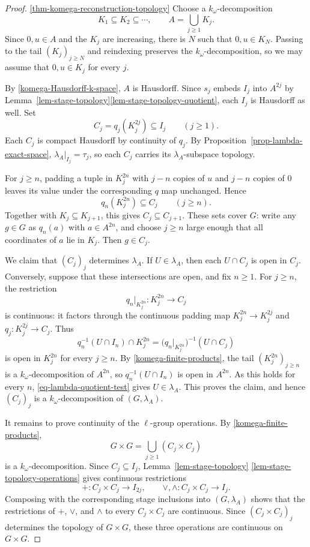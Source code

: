 \documentclass[preprint,3p]{elsarticle}
\theoremstyle{plain}
\theoremstyle{definition}
\numberwithin{equation}{section}
\begin{document}
\begin{proof}
\ref{thm-komega-reconstruction-topology}
Choose a $k_\omega$-decomposition
\[
 K_1\subseteq K_2\subseteq\cdots,\qquad
 A=\bigcup_{j\geq1}K_j.
\]
Since $0,u\in A$ and the $K_j$ are increasing, there is $N$ such that
$0,u\in K_N$.  Passing to the tail $(K_j)_{j\geq N}$ and reindexing
preserves the $k_\omega$-decomposition, so we may assume that
$0,u\in K_j$ for every $j$.

By \ref{komega-Hausdorff-k-space}, $A$ is Hausdorff.
Since $s_j$ embeds $I_j$ into $A^{2j}$ by
Lemma~\ref{lem-stage-topology}\ref{lem-stage-topology-quotient},
each $I_j$ is Hausdorff as well.
Set
\[
 C_j=q_j(K_j^{2j})\subseteq I_j\qquad(j\geq1).
\]
Each $C_j$ is compact Hausdorff by continuity of $q_j$.
By Proposition~\ref{prop-lambda-exact-space}, $\lambda_A|_{I_j}=\tau_j$,
so each $C_j$ carries its $\lambda_A$-subspace topology.

For $j\geq n$, padding a tuple in $K_j^{2n}$ with $j-n$ copies
of $u$ and $j-n$ copies of $0$ leaves its value under the
corresponding $q$ map unchanged.  Hence
\[
 q_n(K_j^{2n})\subseteq C_j\qquad(j\geq n).
\]
Together with $K_j\subseteq K_{j+1}$, this gives
$C_j\subseteq C_{j+1}$.  These sets cover $G$: write any $g\in G$
as $q_n(a)$ with $a\in A^{2n}$, and choose $j\geq n$ large enough
that all coordinates of $a$ lie in $K_j$.  Then $g\in C_j$.

We claim that $(C_j)_j$ determines $\lambda_A$.
If $U\in\lambda_A$, then each $U\cap C_j$ is open in $C_j$.
Conversely, suppose that these intersections are open, and fix $n\geq1$.
For $j\geq n$, the restriction
\[
 q_n|_{K_j^{2n}}\colon K_j^{2n}\longrightarrow C_j
\]
is continuous: it factors through the continuous padding map
$K_j^{2n}\longrightarrow K_j^{2j}$ and
$q_j\colon K_j^{2j}\longrightarrow C_j$.  Thus
\[
 q_n^{-1}(U\cap I_n)\cap K_j^{2n}
 =\bigl(q_n|_{K_j^{2n}}\bigr)^{-1}(U\cap C_j)
\]
is open in $K_j^{2n}$ for every $j\geq n$.
By \ref{komega-finite-products}, the tail $(K_j^{2n})_{j\geq n}$
is a $k_\omega$-decomposition of $A^{2n}$, so
$q_n^{-1}(U\cap I_n)$ is open in $A^{2n}$.
As this holds for every $n$, \eqref{eq-lambda-quotient-test}
gives $U\in\lambda_A$.  This proves the claim, and hence
$(C_j)_j$ is a $k_\omega$-decomposition of $(G,\lambda_A)$.

It remains to prove continuity of the $\ell$-group operations.
By \ref{komega-finite-products},
\[
 G\times G=\bigcup_{j\geq1}(C_j\times C_j)
\]
is a $k_\omega$-decomposition.  Since $C_j\subseteq I_j$,
Lemma~\ref{lem-stage-topology}%
\ref{lem-stage-topology-operations} gives continuous restrictions
\[
 +\colon C_j\times C_j\longrightarrow I_{2j},
 \qquad
 \vee,\wedge\colon C_j\times C_j\longrightarrow I_j.
\]
Composing with the corresponding stage inclusions into
$(G,\lambda_A)$ shows that the restrictions of $+$, $\vee$, and
$\wedge$ to every $C_j\times C_j$ are continuous.  Since
$(C_j\times C_j)_j$ determines the topology of $G\times G$, these
three operations are continuous on $G\times G$.


\end{proof}
\end{document}
